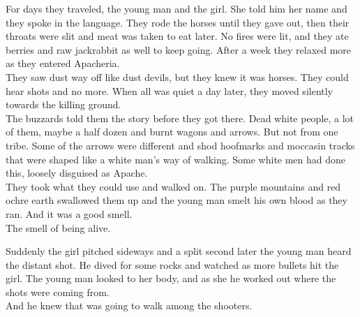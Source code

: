 



For days they traveled, the young man and the  girl. She told him her name and they spoke in the language. They rode the horses until they gave out, then their throats were slit and meat was taken to eat later. No fires were lit, and they ate berries and raw jackrabbit as well to keep going. After a week they relaxed more as they entered Apacheria. \\

They saw dust way off like dust devils, but they knew it was horses. They could hear shots and no more. When all was quiet a day later, they moved silently towards the killing ground. \\

The buzzards told them the story before they got there. Dead white people, a lot of them, maybe a half dozen and burnt wagons and arrows. But not from one tribe. Some of the arrows were different and shod hoofmarks and moccasin tracks that were shaped like a white man's way of walking. Some white men had done this, loosely disguised as Apache. \\

They took what they could use and walked on. The purple mountains and red ochre earth swallowed them up and the young man smelt his own blood as they ran. And it was a good smell. \\

The smell of being alive. \\




Suddenly the girl pitched sideways and a split second later the young man heard the distant shot. He dived for some rocks and watched as more bullets hit the girl. The young man looked to her body, and as she  he worked out where the shots were coming from. \\

And he knew that  was going to walk among the shooters. \\



